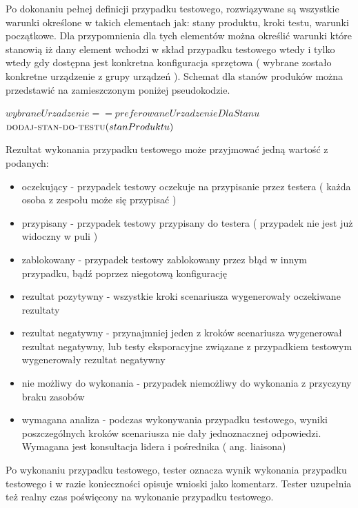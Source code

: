 Po dokonaniu pełnej definicji przypadku testowego, rozwiązywane są wszystkie warunki określone w takich elementach jak: stany produktu, kroki testu, warunki początkowe. Dla przypomnienia dla tych elementów można określić warunki które stanowią iż dany element wchodzi w skład przypadku testowego wtedy i tylko wtedy gdy dostępna jest konkretna konfiguracja sprzętowa ( wybrane zostało konkretne urządzenie z grupy urządzeń ). Schemat dla stanów produków można przedstawić na zamieszczonym poniżej pseudokodzie.

	\begin{codebox}
	\li {}
	\li \Do   
	\li \Do
	     \If $wybraneUrzadzenie  ==  preferowaneUrzadzenieDlaStanu$
	\li     \Then
	           $\textnormal{\scshape dodaj-stan-do-testu}(stanProduktu)$	         	         
	        \End	        
	\li  \End	 
	\li
	  \End
	  
	\end{codebox}

Rezultat wykonania przypadku testowego może przyjmować jedną wartość z podanych:
\begin{itemize}
   \item oczekujący - przypadek testowy oczekuje na przypisanie przez testera ( każda osoba z zespołu może się przypisać )
   \item przypisany - przypadek testowy przypisany do testera ( przypadek nie jest już widoczny w puli )
   \item zablokowany - przypadek testowy zablokowany przez błąd w innym przypadku, bądź poprzez niegotową konfigurację
   \item rezultat pozytywny - wszystkie kroki scenariusza wygenerowały oczekiwane rezultaty
   \item rezultat negatywny - przynajmniej jeden z kroków scenariusza wygenerował rezultat negatywny, lub testy eksporacyjne związane z przypadkiem testowym wygenerowały rezultat negatywny
   \item nie możliwy do wykonania - przypadek niemożliwy do wykonania z przyczyny braku zasobów
   \item wymagana analiza - podczas wykonywania przypadku testowego, wyniki poszczególnych kroków scenariusza nie dały jednoznacznej odpowiedzi. Wymagana jest konsultacja lidera i pośrednika ( ang. liaisona)
 \end{itemize} 

Po wykonaniu przypadku testowego, tester oznacza wynik wykonania przypadku testowego i w razie konieczności opisuje wnioski jako komentarz. Tester uzupełnia też realny czas poświęcony na wykonanie przypadku testowego.


